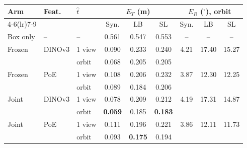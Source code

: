 \begin{tabular}{@{}lll ccc ccc@{}}
\toprule
Arm & Feat. & $\hat t$ & \multicolumn{3}{c}{$E_T$ (m)} & \multicolumn{3}{c}{$E_R$ ($^\circ$), orbit} \\
\cmidrule(lr){4-6}\cmidrule(lr){7-9} & & & Syn. & LB & SL & Syn. & LB & SL \\
\midrule
Box only & -- & -- & 0.561 & 0.547 & 0.553 & -- & -- & -- \\
\midrule
Frozen & DINOv3 & 1 view & 0.090 & 0.233 & 0.240 & 4.21 & 17.40 & 15.27 \\
 &  & orbit & 0.068 & 0.205 & 0.205 &  &  &  \\
Frozen & PoE & 1 view & 0.108 & 0.206 & 0.232 & 3.87 & 12.30 & 12.25 \\
 &  & orbit & 0.089 & 0.184 & 0.206 &  &  &  \\
\midrule
Joint & DINOv3 & 1 view & 0.078 & 0.209 & 0.212 & 4.19 & 17.31 & 14.87 \\
 &  & orbit & \textbf{0.059} & 0.185 & \textbf{0.183} &  &  &  \\
Joint & PoE & 1 view & 0.111 & 0.196 & 0.221 & 3.86 & 12.11 & 11.73 \\
 &  & orbit & 0.093 & \textbf{0.175} & 0.194 &  &  &  \\
\bottomrule
\end{tabular}